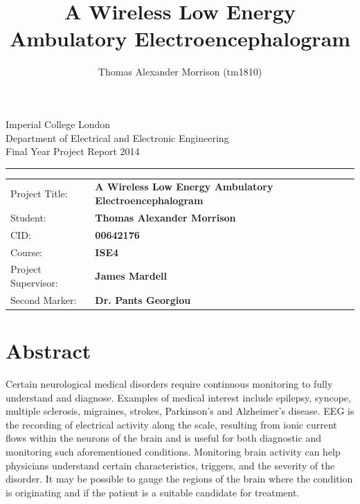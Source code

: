 \documentclass[]{article}
\title{A Wireless  Low Energy Ambulatory Electroencephalogram}
\author{Thomas Alexander Morrison (tm1810)}
\begin{document}
\begin{titlepage}
\setlength{\parindent}{0pt}
\setlength{\parskip}{0pt}

{
\Large
\raggedright
Imperial College London\\[17pt]
Department of Electrical and Electronic Engineering\\[17pt]
Final Year Project Report 2014\\[17pt]

}
\rule{\columnwidth}{3pt}

\vfill

\centering

\vfill

\setlength{\tabcolsep}{0pt}
\begin{tabular}{p{40mm}p{\dimexpr\columnwidth-40mm}}
Project Title: & \textbf{A Wireless  Low Energy Ambulatory Electroencephalogram} \\[12pt]
Student: & \textbf{Thomas Alexander Morrison} \\[12pt]
CID: & \textbf{00642176} \\[12pt]
Course: & \textbf{ISE4} \\[12pt]
Project Supervisor: & \textbf{James Mardell} \\[12pt]
Second Marker: & \textbf{Dr. Pants Georgiou} \\
\end{tabular}
\end{titlepage}

\clearpage





\clearpage

\section*{Abstract}
Certain neurological medical disorders require continuous monitoring to fully understand and diagnose. Examples of medical interest include epilepsy, syncope, multiple sclerosis, migraines, strokes, Parkinson’s and Alzheimer’s disease. \ac{EEG} is the recording of electrical activity along the scale, resulting from ionic current flows within the neurons of the brain and is useful for both diagnostic and monitoring such aforementioned conditions. Monitoring brain activity can help physicians understand certain characteristics, triggers, and the severity of the disorder. It may be possible to gauge the regions of the brain where the condition is originating and if the patient is a suitable candidate for treatment. 
\end{document}
